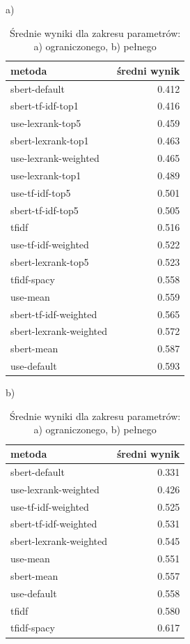 	\begin{table}[htb]
		\caption{Średnie wyniki dla zakresu parametrów: a) ograniczonego, b) pełnego}\label{tab:avg_scores} %
		\centering
		\begin{minipage}[t]{.5\textwidth}
			a)\par\medskip %
			\begin{tabular}{lr}
				\toprule
								metoda &	średni wynik \\
				\midrule
								sbert-default & 0.412 \\
						sbert-tf-idf-top1 & 0.416 \\
							use-lexrank-top5 & 0.459 \\
						sbert-lexrank-top1 & 0.463 \\
					use-lexrank-weighted & 0.465 \\
							use-lexrank-top1 & 0.489 \\
							use-tf-idf-top5 & 0.501 \\
						sbert-tf-idf-top5 & 0.505 \\
												tfidf & 0.516 \\
					use-tf-idf-weighted & 0.522 \\
						sbert-lexrank-top5 & 0.523 \\
									tfidf-spacy & 0.558 \\
											use-mean & 0.559 \\
				sbert-tf-idf-weighted & 0.565 \\
				sbert-lexrank-weighted & 0.572 \\
										sbert-mean & 0.587 \\
									use-default & 0.593 \\
				\bottomrule
			\end{tabular}
		\end{minipage}%
		\begin{minipage}[t]{.5\textwidth}
			b)\par\medskip %
			\begin{tabular}{lr}
				\toprule
								metoda &	średni wynik \\
				\midrule
								sbert-default & 0.331 \\
					use-lexrank-weighted & 0.426 \\
					use-tf-idf-weighted & 0.525 \\
				sbert-tf-idf-weighted & 0.531 \\
				sbert-lexrank-weighted & 0.545 \\
											use-mean & 0.551 \\
										sbert-mean & 0.557 \\
									use-default & 0.558 \\
												tfidf & 0.580 \\
									tfidf-spacy & 0.617 \\
				\bottomrule
				\end{tabular}
		\end{minipage}
	\end{table}

